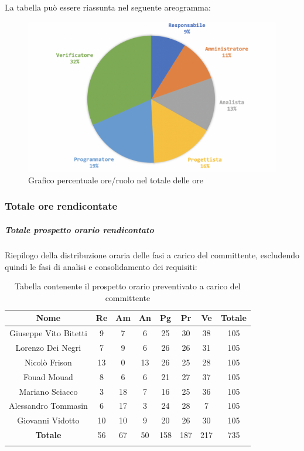 			La tabella può essere riassunta nel seguente areogramma:
			\begin{figure}[H]
				\centering
				\includegraphics[width=0.8\linewidth]{./images/preventivo/totOre2.png}
				\caption{Grafico percentuale ore/ruolo nel totale delle ore}
				\label{fig:grafico costi ruolo fase totale ore}
			\end{figure}
		
			\subsubsection{Totale ore rendicontate}
				\subparagraph{Totale prospetto orario rendicontato}
				Riepilogo della distribuzione oraria delle fasi a carico del committente, escludendo quindi le fasi di analisi e consolidamento dei requisiti:
				
				\begin{longtable}{|c|c|c|c|c|c|c|c|}
					\hline
					\rowcolor{lighter-grayer}
					\textbf{Nome} & \textbf{Re} & \textbf{Am} & \textbf{An} & \textbf{Pg}  & \textbf{Pr}   & \textbf{Ve} & \textbf{Totale} \\
					\hline
					\endfirsthead
					
					\hline
					Giuseppe Vito Bitetti 		& 9 & 7 & 6 & 25 & 30 & 38 & 105\\
					\hline
					\hline
					Lorenzo Dei Negri			& 7 & 9 & 6 & 26 & 26 & 31 & 105\\
					\hline
					\hline
					Nicolò Frison				    & 13 & 0 & 13 &26 & 25 & 28 & 105\\
					\hline
					\hline
					Fouad Mouad 				 & 8 & 6 & 6 & 21 & 27 & 37 & 105\\
					\hline
					\hline
					Mariano Sciacco 			& 3 & 18 & 7 & 16 & 25 & 36 & 105\\
					\hline
					\hline
					Alessandro Tommasin    & 6 & 17 & 3 & 24 & 28 & 7 & 105\\
					\hline
					\hline
					Giovanni Vidotto 			 & 10 & 10 & 9 & 20 & 26 & 30 & 105\\
					\hline 
					\textbf{Totale}				 & 56 &  67 & 50 & 158 & 187 & 217 & 735\\
					\hline
					\caption{Tabella contenente il prospetto orario preventivato a carico del committente}
				\end{longtable}
				\pagebreak
				
